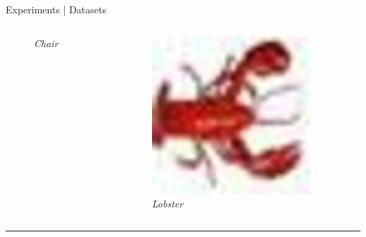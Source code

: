 \begin{frame}{Experiments | Datasets}
\begin{columns}
\begin{column}{0.2\textwidth}
\begin{figure}
        \captionsetup{labelformat=empty, justification=centering, font=scriptsize}
        \caption{\emph{Chair}}
      \end{figure}
    \end{column}
    \begin{column}{0.2\textwidth}
      \begin{figure}
        \centering
        \includegraphics[width=.7\linewidth]{figures/CIFAR100/example_3.jpg}
        \captionsetup{labelformat=empty, justification=centering, font=scriptsize}
        \caption{\emph{Lobster}}
      \end{figure}
    \end{column}
  \end{columns}

  \rule{\linewidth}{0.4pt}


\end{frame}
